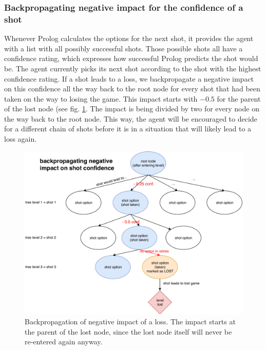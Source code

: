 \subsubsection{Backpropagating negative impact for the confidence of a shot}\label{subsec:backpropagationConfidence}
Whenever Prolog calculates the options for the next shot, it provides the agent with a list with all possibly successful shots. Those possible shots all have a confidence rating, which expresses how successful Prolog predicts the shot would be. The agent currently picks its next shot according to the shot with the highest confidence rating. If a shot leads to a loss, we backpropagate a negative impact on this confidence all the way back to the root node for every shot that had been taken on the way to losing the game. This impact starts with \(-0.5\) for the parent of the lost node (see fig. \ref{fig:negativeImpact}. The impact is being divided by two for every node on the way back to the root node. This way, the agent will be encouraged to decide for a different chain of shots before it is in a situation that will likely lead to a loss again.

\begin{figure}
	\includegraphics[width=\textwidth]{img/negImpact.pdf}
	\caption{Backpropagation of negative impact of a loss. The impact starts at the parent of the lost node, since the lost node itself will never be re-entered again anyway.}\label{fig:negativeImpact}
\end{figure}

